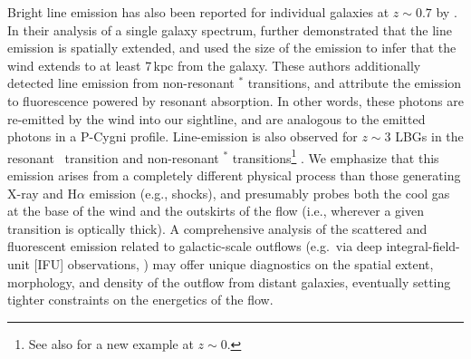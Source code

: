 \documentclass[12pt,preprint]{aastex}
\begin{document}
Bright  line emission has also been
reported for individual galaxies at $z \sim 0.7$ by \cite[][see also
Rubin et al\ 2011, in prep.]{rubin+10c}.
In their analysis of a single galaxy spectrum, \cite{rubin+10c}
further demonstrated that the  line emission is spatially
extended, and used the size of the emission to infer that the wind 
extends to at least 7\,kpc from the galaxy.
These authors additionally detected line
emission from non-resonant $^*$ transitions, and attribute
the emission to fluorescence powered by  resonant
absorption.  In other words, these photons are re-emitted by the wind
into our sightline, and are analogous to the emitted photons in a P-Cygni profile.
Line-emission is
also observed for $z \sim 3$ LBGs in the resonant \lya\ transition
and non-resonant $^*$ transitions\footnote{See also
  \cite{france10} for a new example at $z \sim 0$.} \citep{prs+02,shapley03}.
We emphasize that this emission arises from a completely different
physical process than those generating X-ray and H$\alpha$ emission
(e.g., shocks), and presumably probes both the cool gas at the base of
the wind and the outskirts of the flow (i.e., wherever a given
transition is optically thick).
A comprehensive analysis of the %
scattered and fluorescent emission
related to galactic-scale outflows
(e.g.\ via deep integral-field-unit [IFU] observations,
\citealt{ssb+05,wsg08}) 
may offer unique
diagnostics on the spatial extent, morphology, and density of the outflow 
from distant galaxies,
eventually
setting tighter constraints on the energetics of the flow.   

\end{document}
